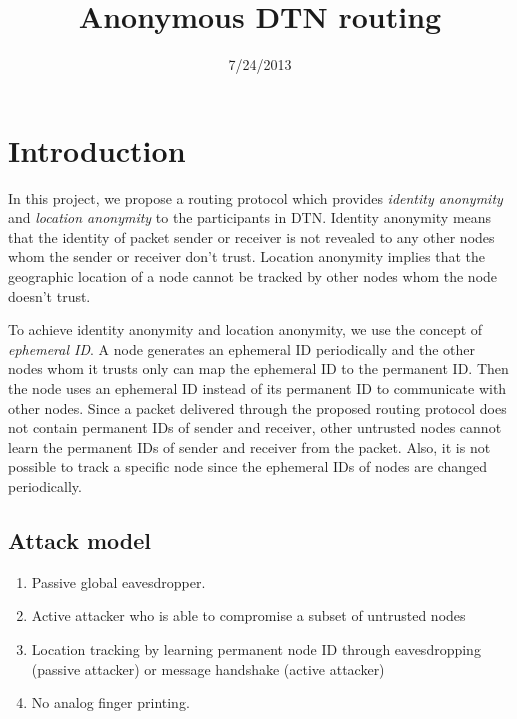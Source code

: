 \documentclass[11pt]{article}
\begin{document}
\title{Anonymous DTN routing}
\date{7/24/2013}
\maketitle

\section{Introduction}
In this project, we propose a routing protocol which provides \textit{identity anonymity} and \textit{location anonymity} to the participants in DTN.  Identity anonymity means that the identity of packet sender or receiver is not revealed to any other nodes whom the sender or receiver don't trust.  Location anonymity implies that the geographic location of a node cannot be tracked by other nodes whom the node doesn't trust.  

To achieve identity anonymity and location anonymity, we use the concept of \textit{ephemeral ID}.  A node generates an ephemeral ID periodically and the other nodes whom it trusts only can map the ephemeral ID to the permanent ID.  Then the node uses an ephemeral ID instead of its permanent ID to communicate with other nodes.  Since a packet delivered through the proposed routing protocol does not contain permanent IDs of sender and receiver, other untrusted nodes cannot learn the permanent IDs of sender and receiver from the packet.  Also, it is not possible to track a specific node since the ephemeral IDs of nodes are changed periodically. 


\subsection{Attack model}
\begin{enumerate}
\item Passive global eavesdropper.
\item Active attacker who is able to compromise a subset of untrusted nodes
\item Location tracking by learning permanent node ID through eavesdropping (passive attacker) or message handshake (active attacker)
\item No analog finger printing.
\end{enumerate}
\end{document}
